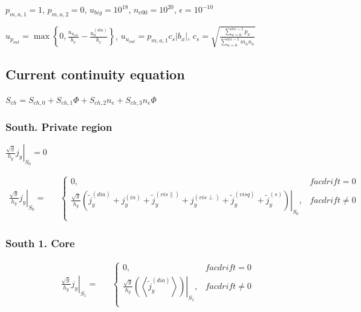 \documentclass[a4paper,10pt]{report}
\begin{document}
$p_{m,a,1} = 1$, $p_{m,a,2} = 0$, $u_{big} = 10^{18}$, $n_{e00} = 10^{20}$, $\epsilon = 10^{-10}$

$u_{p_{out}} = \max \left\{ 0, \frac{u_{u_{out}}}{b_x} - \frac{u_a^{(dia)}}{b_x}  \right\}$,
$u_{u_{out}} = p_{m,a,1} c_s |b_x|$,
$c_s = \sqrt{\frac{\sum \limits_{a=0}^{ns-1} p_a}{\sum \limits_{a=0}^{ns-1} m_a n_a}}$


\subsection{Current continuity equation}

$S_{ch} = S_{ch,0} + S_{ch,1} \Phi + S_{ch,2} n_e + S_{ch,3} n_e \Phi$

\subsubsection{South. Private region}

$\left. \frac{\sqrt{g}}{h_y} j_y \right|_{S_0} = 0$

\begin{equation*}
\begin{matrix}
\left. \frac{\sqrt{g}}{h_y} j_y \right|_{S_0} = &
& \left\{
\begin{matrix}
0, & facdrift = 0 \\
\left. \frac{\sqrt{g}}{h_y}
\left(
	\widetilde j_y^{(dia)} + j_y^{(in)} + \widetilde j_y^{(vis \parallel)} + j_y^{(vis \perp)}
	+ \widetilde j_y^{(visq)} + \widetilde j_y^{(s)}
\right) \right|_{S_0}
, & facdrift \neq 0 \\
\end{matrix} \right.
\end{matrix}
\end{equation*}

\subsubsection{South 1. Core}

\begin{equation*}
\begin{matrix}
\left. \frac{\sqrt{g}}{h_y} j_y \right|_{S_1} = &
& \left\{
\begin{matrix}
0, & facdrift = 0 \\
\left. \frac{\sqrt{g}}{h_y}
\left(
	\left\langle \widetilde j_y^{(dia)} \right\rangle
\right) \right|_{S_1}
, & facdrift \neq 0 \\
\end{matrix} \right.
\end{matrix}
\end{equation*}
\end{document}
